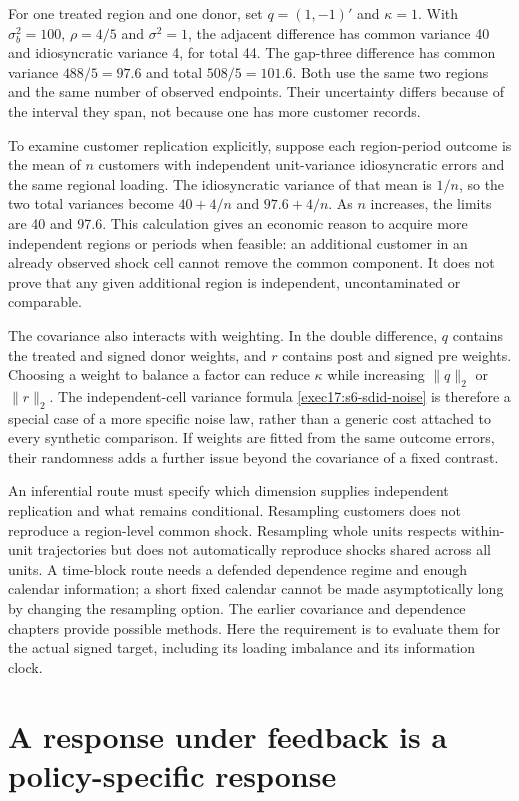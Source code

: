 For one treated region and one donor, set $q=(1,-1)'$ and
$\kappa=1$. With $\sigma_b^2=100$, $\rho=4/5$ and $\sigma^2=1$,
the adjacent difference has common variance 40 and idiosyncratic variance
4, for total 44. The gap-three difference has common variance
$488/5=97.6$ and total $508/5=101.6$. Both use the same two
regions and the same number of observed endpoints. Their uncertainty
differs because of the interval they span, not because one has more
customer records.~\citep{exec17_s6_math}

To examine customer replication explicitly, suppose each region-period
outcome is the mean of $n$ customers with independent unit-variance
idiosyncratic errors and the same regional loading. The idiosyncratic
variance of that mean is $1/n$, so the two total variances become
$40+4/n$ and $97.6+4/n$. As $n$ increases, the limits are 40
and 97.6. This calculation gives an economic reason to acquire more
independent regions or periods when feasible: an additional customer in
an already observed shock cell cannot remove the common component.
It does not prove that any given additional region is independent,
uncontaminated or comparable.

The covariance also interacts with weighting. In the double difference,
$q$ contains the treated and signed donor weights, and $r$ contains
post and signed pre weights. Choosing a weight to balance a factor can
reduce $\kappa$ while increasing $\|q\|_2$ or $\|r\|_2$.
The independent-cell variance formula
\eqref{exec17:s6-sdid-noise} is therefore a special case of a more
specific noise law, rather than a generic cost attached to every
synthetic comparison. If weights are fitted from the same outcome
errors, their randomness adds a further issue beyond the covariance
of a fixed contrast.

An inferential route must specify which dimension supplies independent
replication and what remains conditional. Resampling customers does not
reproduce a region-level common shock. Resampling whole units respects
within-unit trajectories but does not automatically reproduce shocks
shared across all units. A time-block route needs a defended dependence
regime and enough calendar information; a short fixed calendar cannot
be made asymptotically long by changing the resampling option. The
earlier covariance and dependence chapters provide possible methods.
Here the requirement is to evaluate them for the actual signed target,
including its loading imbalance and its information clock.

\section{A response under feedback is a policy-specific response}
\label{exec17:s6-feedback}

